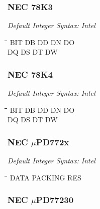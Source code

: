 \subsubsection{NEC 78K3}

{\em Default Integer Syntax: Intel}

{\tt\begin{tabbing}
\hspace{3cm}\=\hspace{3cm}\=\hspace{3cm}\=\hspace{3cm}\=\kill
BIT        \> DB         \> DD          \> DN          \> DO \\
DQ         \> DS         \> DT          \> DW \\
\end{tabbing}}

\subsubsection{NEC 78K4}

{\em Default Integer Syntax: Intel}

{\tt\begin{tabbing}
\hspace{3cm}\=\hspace{3cm}\=\hspace{3cm}\=\hspace{3cm}\=\kill
BIT        \> DB         \> DD          \> DN          \> DO \\
DQ         \> DS         \> DT          \> DW \\
\end{tabbing}}

\subsubsection{NEC $\mu$PD772x}

{\em Default Integer Syntax: Intel}

{\tt\begin{tabbing}
\hspace{3cm}\=\hspace{3cm}\=\hspace{3cm}\=\hspace{3cm}\=\kill
DATA       \> PACKING     \> RES \\
\end{tabbing}}

\subsubsection{NEC $\mu$PD77230}

